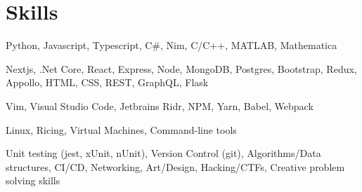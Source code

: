 \section{Skills}
{Python, Javascript, Typescript, C\#, Nim, C/C++, MATLAB, Mathematica}

{Nextjs, .Net Core, React, Express, Node,  MongoDB, Postgres, Bootstrap, Redux, Appollo, HTML, CSS, REST, GraphQL, Flask}

{Vim, Visual Studio Code, Jetbrains Ridr, NPM, Yarn, Babel, Webpack}

{Linux, Ricing, Virtual Machines, Command-line tools}

{Unit testing (jest, xUnit, nUnit), Version Control (git), Algorithms/Data structures, CI/CD, Networking, Art/Design, Hacking/CTFs, Creative problem solving skills}
